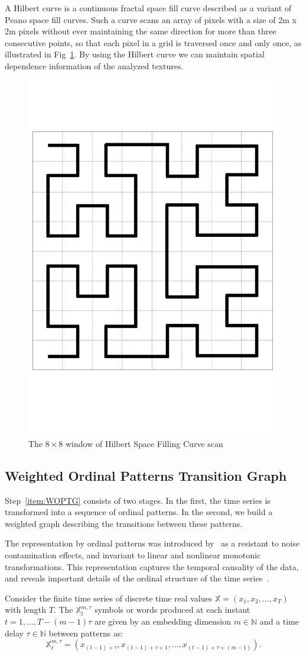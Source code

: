 \documentclass{isprs}
\begin{document}
A Hilbert curve is a continuous fractal space fill curve described as a variant of Peano space fill curves.
Such a curve scans an array of pixels with a size of 2m x 2m pixels without ever maintaining the same direction for more than three consecutive points, so that each pixel in a grid is traversed once and only once, as illustrated in Fig~\ref{fig:Hilbert}.
By using the Hilbert curve we can maintain spatial dependence information of the analyzed textures.

\begin{figure}[hbt]
	\centering
	\includegraphics[width=.3\linewidth]{Figures/hilbert.png}
	\vspace{-0.5cm}
	\caption{The $8 \times 8$ window of Hilbert Space Filling Curve scan}
	\label{fig:Hilbert}
\end{figure}

\subsection{Weighted Ordinal Patterns Transition Graph}\label{WATG}

Step~\ref{item:WOPTG} consists of two stages.
In the first, the time series is transformed into a sequence of ordinal patterns.
In the second, we build a weighted graph describing the transitions between these patterns.

The representation by ordinal patterns was introduced by~\cite{Bandt2002Permutation} as a resistant to noise contamination effects, and invariant to linear and nonlinear monotonic transformations.
This representation captures the temporal causality of the data, and reveals important details of the ordinal structure of the time series~\citep{Larrondo2006Random}.

Consider the finite time series of discrete time real values $\mathbb{X} = (x_1, x_2, \dots, x_T)$ with length $T$.
The $\mathbb{X}_t^{m, \tau} $ symbols or words produced at each instant $t = 1, \dots, T- (m-1) \tau$ are given by an embedding dimension $m \in \mathbb{N}$ and a time delay $\tau \in \mathbb{N}$ between patterns as:
\begin{equation}
\mathbb{X}_t^{m,\tau} = (x_{(t-1)+\tau}, x_{(t-1)+\tau+1},\ldots, x_{(t-1)+\tau+(m-1)}).
\end{equation}
\end{document}
